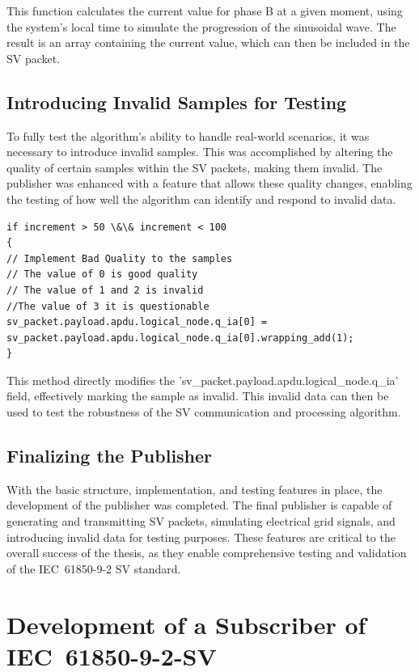This function calculates the current value for phase B at a given moment, using the system's local time to simulate the progression of the sinusoidal wave. The result is an array containing the current value, which can then be included in the SV packet.

\subsection{Introducing Invalid Samples for Testing}

To fully test the algorithm's ability to handle real-world scenarios, it was necessary to introduce invalid samples. This was accomplished by altering the quality of certain samples within the SV packets, making them invalid. The publisher was enhanced with a feature that allows these quality changes, enabling the testing of how well the algorithm can identify and respond to invalid data.

\begin{lstlisting}[caption={How to calculate the value of the SV's}]
if increment > 50 \&\& increment < 100
{
// Implement Bad Quality to the samples
// The value of 0 is good quality
// The value of 1 and 2 is invalid
//The value of 3 it is questionable
sv_packet.payload.apdu.logical_node.q_ia[0] = sv_packet.payload.apdu.logical_node.q_ia[0].wrapping_add(1);	
}
\end{lstlisting}

This method directly modifies the 'sv\_packet.payload.apdu.logical\_node.q\_ia' field, effectively marking the sample as invalid. This invalid data can then be used to test the robustness of the SV communication and processing algorithm.

\subsection{Finalizing the Publisher}

With the basic structure, implementation, and testing features in place, the development of the publisher was completed. The final publisher is capable of generating and transmitting SV packets, simulating electrical grid signals, and introducing invalid data for testing purposes. These features are critical to the overall success of the thesis, as they enable comprehensive testing and validation of the IEC~61850-9-2 SV standard.

\section{Development of a Subscriber of IEC~61850-9-2-SV}

